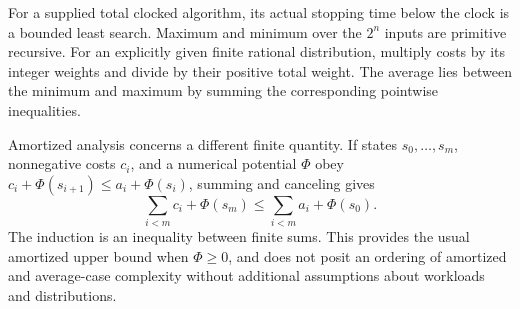 For a supplied total clocked algorithm, its actual stopping time below the
clock is a bounded least search. Maximum and minimum over the \(2^n\)
inputs are primitive recursive. For an explicitly given finite rational
distribution, multiply costs by its integer weights and divide by their
positive total weight. The average lies between the minimum and maximum
by summing the corresponding pointwise inequalities.

Amortized analysis concerns a different finite quantity. If states
\(s_0,\ldots,s_m\), nonnegative costs \(c_i\), and a numerical potential
\(\Phi\) obey
\(c_i+\Phi(s_{i+1})\le a_i+\Phi(s_i)\), summing and canceling gives
\[
 \sum_{i<m}c_i+\Phi(s_m)
       \le\sum_{i<m}a_i+\Phi(s_0).
\]
The induction is an inequality between finite sums. This provides the
usual amortized upper bound when \(\Phi\ge0\), and does not posit an
ordering of amortized and average-case complexity without additional
assumptions about workloads and distributions.
